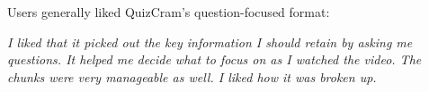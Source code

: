 \documentclass{sigchi}
\begin{document}



Users generally liked QuizCram's question-focused format:

 \emph{I liked that it picked out the key information I should retain by asking me questions. It helped me decide what to focus on as I watched the video. The chunks were very manageable as well. I liked how it was broken up.}




\end{document}
